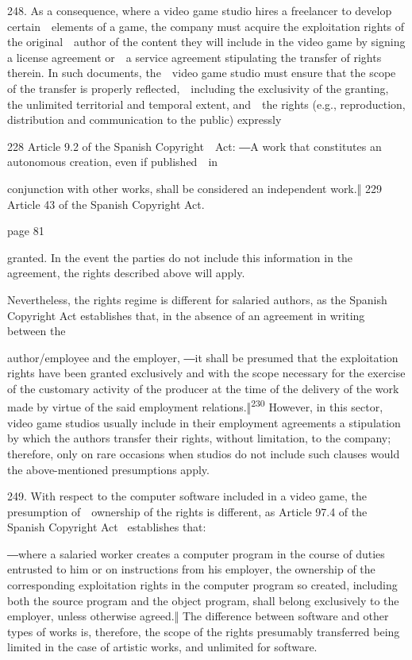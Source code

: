 \documentclass[
]{article}
\begin{document}
{248. }{As a consequence, where a video game studio hires a freelancer
to develop certain~~elements of a game, the company must acquire the
exploitation rights of the original~~author of the content they will
include in the video game by signing a license agreement or~~a service
agreement stipulating the transfer of rights therein. In such documents,
the~~video game studio must ensure that the scope of the transfer is
properly reflected,~~including the exclusivity of the granting, the
unlimited territorial and temporal extent, and~~the rights (e.g.,
reproduction, distribution and communication to the public) expressly}

{228 }{Article 9.2 of the Spanish }{Copyright~~Act}{: }{―}{A work that
constitutes an autonomous creation, even if published~~in}

{conjunction with other works, shall be considered an independent
work.}{‖ }{229 }{Article 43 of the Spanish }{Copyright Act}{.}

{page 81}

{granted. In the event the parties do not include this information in
the agreement, the rights described above will apply.}

{Nevertheless, the rights regime is different for salaried authors, as
the Spanish }{Copyright Act }{establishes that, in the absence of an
agreement in writing between the}

{author/employee and the employer, }{―it shall be presumed that the
exploitation rights have }{been granted exclusively and with the scope
necessary for the exercise of the customary activity of the producer at
the time of the delivery of the work made by virtue of the said
}{employment relations.‖}\textsuperscript{{230 }}{However, in this
sector, video game studios usually include in their employment
agreements a stipulation by which the authors transfer their rights,
without limitation, to the company; therefore, only on rare occasions
when studios do not include such clauses would the above-mentioned
presumptions apply.}

{249. }{With respect to the computer software included in a video game,
the presumption of~~ownership of the rights is different, as Article
97.4 of the Spanish }{Copyright Act }{~establishes that:}

{―where a salaried worker creates a computer program in the course of
dutie}{s entrusted to him or on instructions from his employer, the
ownership of the corresponding exploitation rights in the computer
program so created, including both the source program and the object
program, shall belong exclusively to the employer, unless o}{therwise
agreed.‖ }{The difference between software and other types of works is,
therefore, the scope of the rights presumably transferred being limited
in the case of artistic works, and unlimited for software.}
\end{document}
